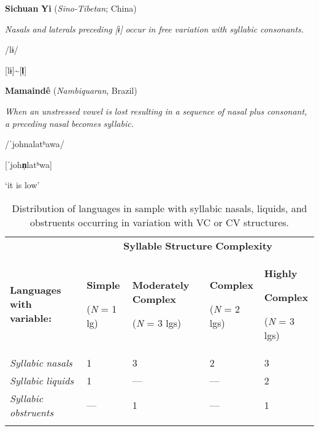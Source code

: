 \ea\label{ex:(3.17)}
   \textbf{Sichuan} \textbf{Yi} (\textit{Sino-Tibetan}; China)

\textit{Nasals} \textit{and} \textit{laterals} \textit{preceding} \textit{[ɨ]} \textit{occur} \textit{in} \textit{free} \textit{variation} \textit{with} \textit{syllabic} \textit{consonants.}

/lɨ/

[lɨ]{\textasciitilde}[\textbf{l̩}]

\citep[31]{Gerner2013}

\z

\ea\label{ex:(3.18)}
   \textbf{Mamaindê} (\textit{Nambiquaran}, Brazil)

\textit{When} \textit{an} \textit{unstressed} \textit{vowel} \textit{is} \textit{lost} \textit{resulting} \textit{in} \textit{a} \textit{sequence} \textit{of} \textit{nasal} \textit{plus} \textit{consonant,} \textit{a} \textit{preceding} \textit{nasal} \textit{becomes} \textit{syllabic.}

/ˈjohnalatʰawa/

[ˈjoh\textbf{n̩}latʰwa]

‘it is low’

\citep[262-3]{Eberhard2009}

\z

\begin{table}
\begin{tabularx}{\textwidth}{XXXXX}
 & \multicolumn{4}{c}{ \textbf{Syllable} \textbf{Structure} \textbf{Complexity}}\\
\lsptoprule
 \textbf{Languages} \textbf{with} \textbf{variable:} & { \textbf{Simple}}

 (\textit{N} = 1 lg) & { \textbf{Moderately} \textbf{Complex}}

 (\textit{N} = 3 lgs) & { \textbf{Complex}}

 (\textit{N} = 2 lgs) & { \textbf{Highly} }

{ \textbf{Complex}}

 (\textit{N} = 3 lgs)\\
 \textit{Syllabic} \textit{nasals} & 1 & 3 & 2 & 3\\
 \textit{Syllabic} \textit{liquids} & 1 & — & — & 2\\
 \textit{Syllabic} \textit{obstruents} & — & 1 & — & 1\\
\lspbottomrule
\end{tabularx}
\caption{\label{3.7}Distribution of languages in sample with syllabic nasals, liquids, and obstruents occurring in variation with VC or CV structures.}
\end{table}

